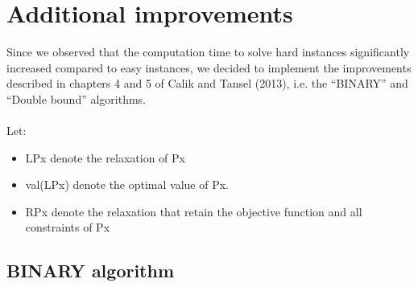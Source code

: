 \newpage
\chapter{Additional improvements}

Since we observed that the computation time to solve hard instances significantly increased compared to easy instances, we decided to implement the improvements described in chapters 4 and 5 of Calik and Tansel (2013), i.e. the ``BINARY'' and ``Double bound'' algorithms.\\\\
Let: 
\begin{itemize}
	\item LPx denote the relaxation of Px
	\item val(LPx) denote the optimal value of Px.
	\item RPx denote the relaxation that retain the objective function and all constraints of Px
\end{itemize} 

\section{BINARY algorithm}

